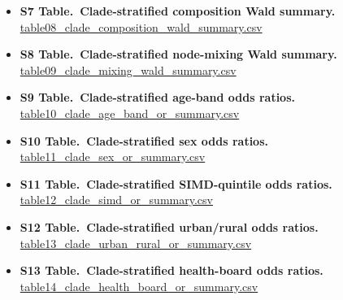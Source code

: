 \documentclass[10pt,letterpaper]{article}
\begin{document}
\begin{itemize}
\item \textbf{S7 Table.\ Clade-stratified composition Wald summary.} \url{table08_clade_composition_wald_summary.csv}
\item \textbf{S8 Table.\ Clade-stratified node-mixing Wald summary.} \url{table09_clade_mixing_wald_summary.csv}
\item \textbf{S9 Table.\ Clade-stratified age-band odds ratios.} \url{table10_clade_age_band_or_summary.csv}
\item \textbf{S10 Table.\ Clade-stratified sex odds ratios.} \url{table11_clade_sex_or_summary.csv}
\item \textbf{S11 Table.\ Clade-stratified SIMD-quintile odds ratios.} \url{table12_clade_simd_or_summary.csv}
\item \textbf{S12 Table.\ Clade-stratified urban/rural odds ratios.} \url{table13_clade_urban_rural_or_summary.csv}
\item \textbf{S13 Table.\ Clade-stratified health-board odds ratios.} \url{table14_clade_health_board_or_summary.csv}
\end{itemize}
\end{document}
